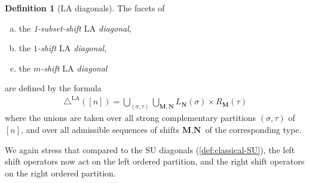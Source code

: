 \documentclass{amsart}
\theoremstyle{definition}
\newtheorem{definition}[theorem]{Definition}
\newcommand{\SU}{\mathrm{SU}}
\newcommand{\LA}{\mathrm{LA}}
\newcommand{\LAD}{\triangle^{\mathrm{LA}}}
\begin{document}
\begin{definition}[$\LA$ diagonals]
    \label{def:shift-LA}
   The facets of 
   \begin{enumerate}[(a)]
    \item the \emph{1-subset-shift $\LA$ diagonal},
    \item the \emph{$1$-shift $\LA$ diagonal},
    \item the \emph{$m$-shift $\LA$ diagonal}
   \end{enumerate}
   are defined by the formula
    \begin{align*}
        \LAD([n]) = \bigcup_{(\sigma,\tau)} \bigcup_{\mathbf{M}, \mathbf{N}} L_\mathbf{N}(\sigma)\times R_\mathbf{M}(\tau)
    \end{align*}
    where the unions are taken over all strong complementary partitions $(\sigma, \tau)$ of $[n]$, and over all admissible sequences of shifts $\textbf{M},\textbf{N}$ of the corresponding type.
\end{definition}

We again stress that compared to the $\SU$ diagonals (\cref{def:classical-SU}), the left shift operators now act on the left ordered partition, and the right shift operators on the right ordered partition.
\end{document}
